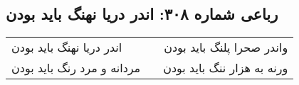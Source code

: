 \begin{center}
\section*{رباعی شماره ۳۰۸: اندر دریا نهنگ باید بودن}
\label{sec:sh308}
\begin{longtable}{l p{0.5cm} r}
اندر دریا نهنگ باید بودن
&&
واندر صحرا پلنگ باید بودن
\\
مردانه و مرد رنگ باید بودن
&&
ورنه به هزار ننگ باید بودن
\\
\end{longtable}
\end{center}
